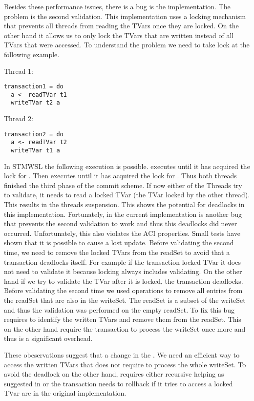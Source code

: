 Besides these performance issues, there is a bug is the implementation. The problem is the second validation. 
This implementation uses a locking mechanism that prevents all threads from reading the TVars once they are locked.
On the other hand it allows us to only lock the TVars that are written instead of all TVars that were accessed.
To understand the problem we need to take lock at the following example.
\par\noindent
\begin{minipage}[t]{.45\textwidth}
Thread 1:
\begin{lstlisting}[frame=lrtb]
transaction1 = do
  a <- readTVar t1
  writeTVar t2 a
\end{lstlisting}
\end{minipage}
\hfill
\begin{minipage}[t]{.45\textwidth}
Thread 2:
\begin{lstlisting}[frame=lrtb]
transaction2 = do
  a <- readTVar t2
  writeTVar t1 a
\end{lstlisting}
\end{minipage}
In STMWSL the following execution is possible.  executes until it has acquired the lock for 
. Then  executes until it has acquired the lock for . Thus both threads
finished the third phase of the commit scheme. If now either of the Threads try to validate, it needs to 
read a locked TVar (the TVar locked by the other thread). This results in the threads suspension. This 
shows the potential for deadlocks in this implementation. Fortunately, in the current implementation is
another bug that prevents the second validation to work and thus this deadlocks did never occurred.
Unfortunately, this also violates the ACI properties. Small tests have shown that it is possible to 
cause a lost update. Before validating the second time, we need to remove the locked TVars from the 
readSet to avoid that a transaction deadlocks itself. For example if the transaction locked TVar 
it does not need to validate it because locking always includes validating. On the other hand if we try to
validate the TVar after it is locked, the transaction deadlocks. Before validating the second time 
we used  operations to remove all entries from the readSet that are also in the writeSet. 
The readSet is a subset of the writeSet and thus the validation was performed on the empty readSet.
To fix this bug requires to identify the written TVars and remove them from the readSet. This on the other
hand require the transaction to process the writeSet once more and thus is a significant overhead. 

These obeservations suggest that a change in the . We need an efficient way to access 
the written TVars that does not require to process the whole writeSet. To avoid the deadlock on the other hand,
requires either recursive helping as suggested in \parencite{lockfreedom} or the transaction needs to 
rollback if it tries to access a locked TVar are in the original implementation.
